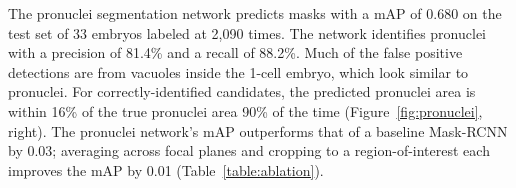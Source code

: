 
 The pronuclei segmentation network predicts masks with a mAP of 0.680 on the test set of 33 embryos labeled at 2,090 times. The network identifies pronuclei with a precision of 81.4\% and a recall of 88.2\%. Much of the false positive detections are from vacuoles inside the 1-cell embryo, which look similar to pronuclei. For correctly-identified candidates, the predicted pronuclei area is within 16\% of the true pronuclei area 90\% of the time (Figure~\ref{fig:pronuclei}, right). The pronuclei network's mAP outperforms that of a baseline Mask-RCNN by 0.03; averaging across focal planes and cropping to a region-of-interest each improves the mAP by 0.01 (Table~\ref{table:ablation}).
